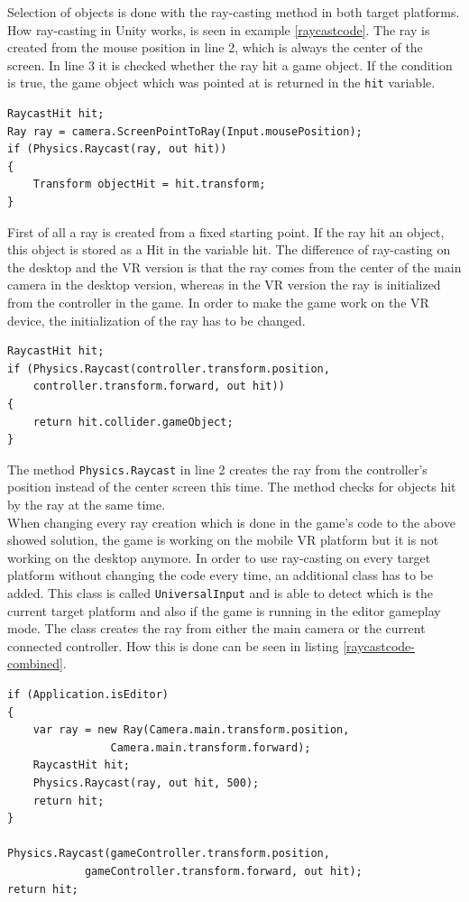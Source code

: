 Selection of objects is done with the ray-casting method in both target platforms. How ray-casting in Unity works, is seen in example \ref{raycastcode}. The ray is created from the mouse position in line 2, which is always the center of the screen. In line 3 it is checked whether the ray hit a game object. If the condition is true, the game object which was pointed at is returned in the \texttt{hit} variable.
\newpage
\begin{lstlisting} 
RaycastHit hit;
Ray ray = camera.ScreenPointToRay(Input.mousePosition);
if (Physics.Raycast(ray, out hit))
{
    Transform objectHit = hit.transform;
}
\end{lstlisting}
\label{raycastcode}
First of all a ray is created from a fixed starting point. If the ray hit an object, this object is stored as a Hit in the variable hit. The difference of ray-casting on the desktop and the VR version is that the ray comes from the center of the main camera in the desktop version, whereas in the VR version the ray is initialized from the controller in the game. In order to make the game work on the VR device, the initialization of the ray has to be changed.
\begin{lstlisting} 
RaycastHit hit;
if (Physics.Raycast(controller.transform.position,
    controller.transform.forward, out hit))
{
    return hit.collider.gameObject;
}
\end{lstlisting}
\label{raycastcode-new}

The method \texttt{Physics.Raycast} in line 2 creates the ray from the controller's position instead of the center screen this time. The method checks for objects hit by the ray at the same time.\\
When changing every ray creation which is done in the game's code to the above showed solution, the game is working on the mobile VR platform but it is not working on the desktop anymore. In order to use ray-casting on every target platform without changing the code every time, an additional class has to be added. This class is called \texttt{UniversalInput} and is able to detect which is the current target platform and also if the game is running in the editor gameplay mode. The class creates the ray from either the main camera or the current connected controller. How this is done can be seen in listing \ref{raycastcode-combined}.
\newpage
\begin{lstlisting} 
if (Application.isEditor)
{
    var ray = new Ray(Camera.main.transform.position, 
                Camera.main.transform.forward);
    RaycastHit hit;
    Physics.Raycast(ray, out hit, 500);
    return hit;
}
  
Physics.Raycast(gameController.transform.position, 
            gameController.transform.forward, out hit);
return hit;
\end{lstlisting}
\label{raycastcode-combined}

